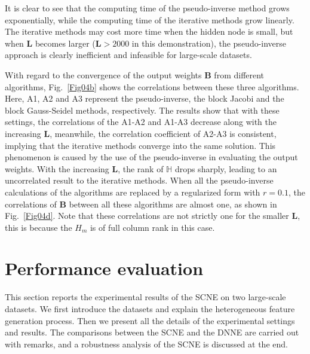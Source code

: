 \documentclass{article}
\begin{document}
It is clear to see that the computing time of the pseudo-inverse method grows exponentially, while the computing time of the iterative methods grow linearly. The iterative methods may cost more time when the hidden node is small, but when $\bm{L}$ becomes larger ($\bm{L} > 2000$ in this demonstration), the pseudo-inverse approach is clearly inefficient and infeasible for large-scale datasets.
 
With regard to the convergence of the output weights $\bm{B}$ from different algorithms, Fig.~\ref{Fig04b} shows the correlations between these three algorithms. Here, A1, A2 and A3 represent the pseudo-inverse,  the block Jacobi  and  the block Gauss-Seidel methods, respectively. 
The results show that with these settings, the correlations of the A1-A2 and A1-A3 decrease along with the increasing $\bm{L}$, meanwhile, the correlation coefficient of A2-A3 is  consistent, implying that the iterative methods  converge into the same solution.
This phenomenon is caused by the use of the pseudo-inverse in evaluating the output weights.
With the increasing $\bm{L}$, the rank of $\mathbb{H}$ drops sharply, leading to an uncorrelated result to the iterative methods.  
When all the pseudo-inverse calculations of the algorithms are replaced by a regularized form with $r = 0.1$, the correlations of $\bm{B}$ between all these algorithms are almost one, as  shown in Fig.~\ref{Fig04d}. Note that these correlations are not strictly one for the smaller $\bm{L}$, this is because the $H_m$ is of full column rank in this case. 



\section{Performance evaluation}
This section reports the experimental results of the SCNE on two large-scale datasets. 
We first introduce the datasets and explain the heterogeneous feature generation process.
Then we present all the details of the experimental settings and results.
The comparisons between the SCNE and the DNNE are carried out with remarks, and a robustness analysis of the SCNE is discussed at the end.
\end{document}
